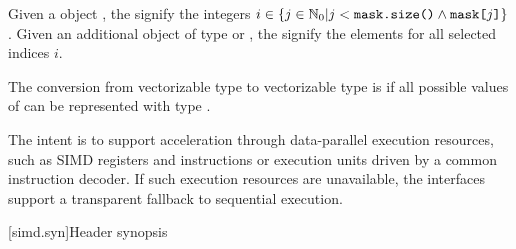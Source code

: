 \pnum
Given a  object ,
the  signify the integers $i \in \{j \in \mathbb{N}_0 | j < \texttt{mask.size()} \wedge \texttt{mask[}j\texttt{]}\}$.
Given an additional object  of type  or ,
the  signify the elements  for all selected indices $i$.

\pnum
The conversion from vectorizable type  to vectorizable type  is  if
all possible values of  can be represented with type .

\pnum
\begin{note}
The intent is to support acceleration through data-parallel execution resources, such as SIMD registers and instructions or execution units driven by a common instruction decoder. If such execution resources are unavailable, the interfaces support a transparent fallback to sequential execution.
\end{note}

[simd.syn]{Header \texorpdfstring{}{<simd>} synopsis}

\newcommand\nativeabi{\UNSP{native-abi}}
\newcommand\deducet{\UNSP{deduce-t}}
\newcommand\simdsizetype{\UNSP{simd-size-type}}
\newcommand\simdselect{\UNSP{simd-select-impl}}
\newcommand\maskelementsize{\UNSP{mask-element-size}}

